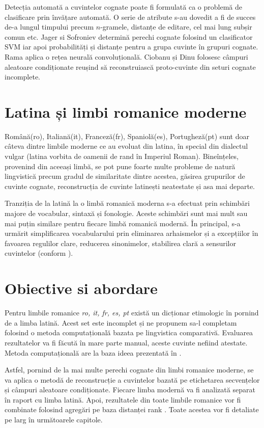 Detecția automată a cuvintelor cognate poate fi formulată ca o problemă de clasificare prin învățare
automată. O serie de atribute s-au dovedit a fi de succes de-a lungul timpului precum $n$-gramele,
distanțe de editare, cel mai lung subșir comun etc. Jager si Sofroniev \cite{svmclass} determină
perechi cognate folosind un clasificator SVM iar apoi probabilități și distanțe pentru a grupa
cuvinte în grupuri cognate. Rama \cite{cnn} aplica o rețea neurală convoluțională. Ciobanu și Dinu
\cite{theone} folosesc câmpuri aleatoare condiționate reușind să reconstruiască proto-cuvinte din
seturi cognate incomplete.

\section{Latina și limbi romanice moderne}
Română(ro), Italiană(it), Franceză(fr), Spaniolă(es), Portugheză(pt) sunt doar câteva dintre limbile
moderne ce au evoluat din latina, în special din dialectul vulgar (latina vorbita de oamenii de rand 
în Imperiul Roman). Bineînțeles, provenind din aceeași limbă, se pot pune foarte multe probleme de 
natură lingvistică precum gradul de similaritate dintre acestea, găsirea grupurilor de cuvinte cognate,
reconstrucția de cuvinte latinești neatestate și asa mai departe.

Tranziția de la latină la o limbă romanică moderna s-a efectuat prin schimbări majore de vocabular, 
sintaxă și fonologie. Aceste schimbări sunt mai mult sau mai puțin similare pentru fiecare limbă
romanică modernă. În principal, s-a urmărit simplificarea vocabularului prin eliminarea arhaismelor
și a excepțiilor în favoarea regulilor clare, reducerea sinonimelor, stabilirea clară a sensurilor
cuvintelor (conform \cite{sala}).

\section{Obiective si abordare}
Pentru limbile romanice \textit{ro, it, fr, es, pt} există un dicționar etimologic în \cite{ripeanubook}
pornind de a limba latină. Acest set este incomplet și ne propunem sa-l completam folosind o metoda 
computațională bazata pe lingvistica comparativă\cite{sub}. Evaluarea rezultatelor va fi făcută în 
mare parte manual, aceste cuvinte nefiind atestate. Metoda computațională are la baza ideea prezentată în 
\cite{theone}.

Astfel, pornind de la mai multe perechi cognate din limbi romanice moderne, se va aplica o metodă
de reconstrucție a cuvintelor bazată pe etichetarea secvențelor și câmpuri aleatoare condiționate. 
Fiecare limba modernă va fi analizată separat în raport cu limba latină. Apoi, rezultatele din toate 
limbile romanice vor fi combinate folosind agregări pe baza distanței rank \cite{rankdistance}.
Toate acestea vor fi detaliate pe larg în următoarele capitole.
